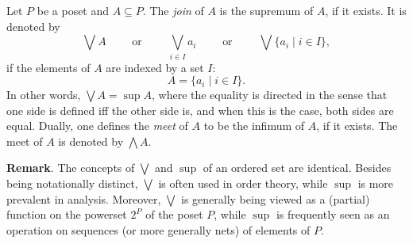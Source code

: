 \documentclass[12pt]{article}
\begin{document}
Let $P$ be a poset and $A\subseteq P$.  The \emph{join} of $A$ is the supremum of $A$, if it exists.  It is denoted by $$\bigvee A \qquad\mbox{ or }\qquad \bigvee_{i\in I}a_i\qquad\mbox{ or }\qquad \bigvee \lbrace a_i\mid i\in I\rbrace,$$ if the elements of $A$ are indexed by a set $I$: $$A=\lbrace a_i\mid i\in I\rbrace.$$  In other words, $\bigvee A = \sup A$, where the equality is directed in the sense that one side is defined iff the other side is, and when this is the case, both sides are equal.  Dually, one defines the \emph{meet} of $A$ to be the infimum of $A$, if it exists.  The meet of $A$ is denoted by $\bigwedge A$.

\textbf{Remark}.  The concepts of $\bigvee$ and $\sup$ of an ordered set are identical.  Besides being notationally distinct, $\bigvee$ is often used in order theory, while $\sup$ is more prevalent in analysis.  Moreover, $\bigvee$ is generally being viewed as a (partial) function on the powerset $2^P$ of the poset $P$, while $\sup$ is frequently seen as an operation on sequences (or more generally nets) of elements of $P$.
\end{document}
